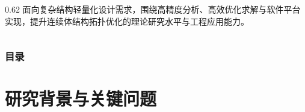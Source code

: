 \documentclass[notheorems]{beamer}
\begin{document}
{\begin{frame}[plain]
\begin{columns}[T, totalwidth=\linewidth]
\begin{column}{0.62\linewidth}
					\vspace{4pt}
					{\fontsize{8}{11}\selectfont
						面向复杂结构轻量化设计需求，围绕高精度分析、高效优化求解与软件平台实现，提升连续体结构拓扑优化的理论研究水平与工程应用能力。}
					
				\end{column}
			\end{columns}
		\end{frame}
	}%
	
	
	
	\begin{frame}
		\frametitle{目录}
		\tableofcontents
	\end{frame}
	
	
	\section{研究背景与关键问题}
	
\end{document}
